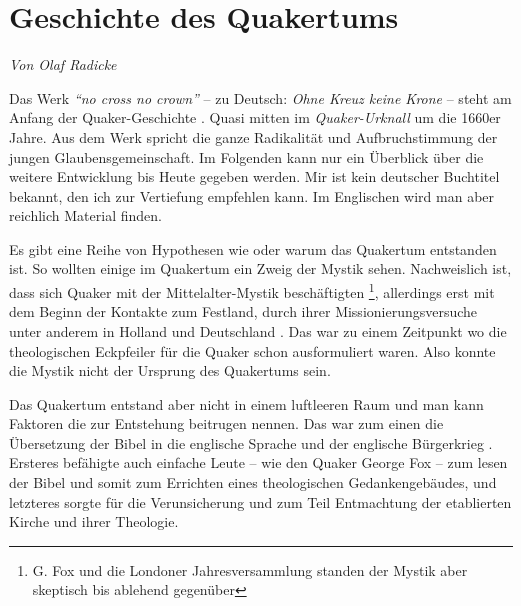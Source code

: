 




\chapter{Geschichte des Quakertums}\label{ref:entwicklung_quakertum}


\begin{flushright}
\begin{footnotesize}
\textit{Von Olaf Radicke}
\end{footnotesize}
\end{flushright}
\smallskip

Das Werk \textit{"`no cross no crown"'} -- zu Deutsch: \textit{Ohne Kreuz keine
Krone} --
steht am Anfang der Quaker-Geschichte . Quasi mitten im
\textit{Quaker-Urknall}
um die 1660er Jahre. Aus dem Werk spricht die ganze Radikalität und
Aufbruchstimmung der jungen Glaubensgemeinschaft. Im Folgenden kann nur ein
Überblick über die weitere Entwicklung bis Heute gegeben werden. Mir ist kein
deutscher Buchtitel bekannt, den ich zur Vertiefung empfehlen kann. Im
Englischen wird man aber reichlich Material finden.

\medskip

Es gibt eine Reihe von Hypothesen wie oder warum das Quakertum
entstanden ist.
So
wollten einige im Quakertum ein Zweig der Mystik  sehen.
Nachweislich ist, dass
sich Quaker mit der Mittelalter-Mystik beschäftigten \footnote{G. Fox und die
Londoner Jahresversammlung standen der Mystik aber skeptisch bis ablehend
gegenüber}, allerdings erst mit dem
Beginn der Kontakte zum Festland, durch ihrer Missionierungsversuche
 unter
anderem in Holland  und Deutschland
. Das war zu einem Zeitpunkt wo die
theologischen Eckpfeiler für die Quaker schon ausformuliert waren. Also konnte
die Mystik nicht der Ursprung des Quakertums sein.

\medskip

Das Quakertum entstand aber nicht in einem luftleeren Raum und man kann Faktoren
die zur Entstehung beitrugen nennen. Das war zum einen die Übersetzung der Bibel
in die englische Sprache und der englische Bürgerkrieg
. Ersteres befähigte auch
einfache Leute -- wie den Quaker George Fox  -- zum
lesen der Bibel und somit zum
Errichten eines theologischen Gedankengebäudes, und letzteres sorgte für die
Verunsicherung und zum Teil Entmachtung der etablierten Kirche
 und ihrer
Theologie.

